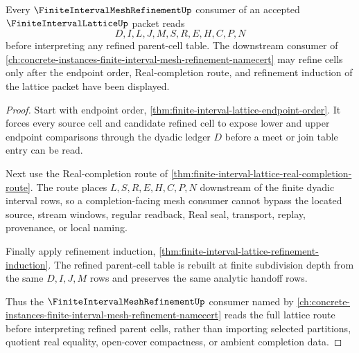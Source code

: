 \begin{theorem}
\label{thm:finite-interval-lattice-mesh-refinement-consumption}
Every $\FiniteIntervalMeshRefinementUp$ consumer of an accepted $\FiniteIntervalLatticeUp$ packet reads
$$
D,I,L,J,M,S,R,E,H,C,P,N
$$
before interpreting any refined parent-cell table. The downstream consumer of \autoref{ch:concrete-instances-finite-interval-mesh-refinement-namecert} may refine cells only after the endpoint order, Real-completion route, and refinement induction of the lattice packet have been displayed.
\end{theorem}
\begin{proof}
Start with endpoint order, \autoref{thm:finite-interval-lattice-endpoint-order}. It forces every source cell and candidate refined cell to expose lower and upper endpoint comparisons through the dyadic ledger $D$ before a meet or join table entry can be read.

Next use the Real-completion route of \autoref{thm:finite-interval-lattice-real-completion-route}. The route places $L,S,R,E,H,C,P,N$ downstream of the finite dyadic interval rows, so a completion-facing mesh consumer cannot bypass the located source, stream windows, regular readback, Real seal, transport, replay, provenance, or local naming.

Finally apply refinement induction, \autoref{thm:finite-interval-lattice-refinement-induction}. The refined parent-cell table is rebuilt at finite subdivision depth from the same $D,I,J,M$ rows and preserves the same analytic handoff rows.

Thus the $\FiniteIntervalMeshRefinementUp$ consumer named by \autoref{ch:concrete-instances-finite-interval-mesh-refinement-namecert} reads the full lattice route before interpreting refined parent cells, rather than importing selected partitions, quotient real equality, open-cover compactness, or ambient completion data.
\end{proof}


